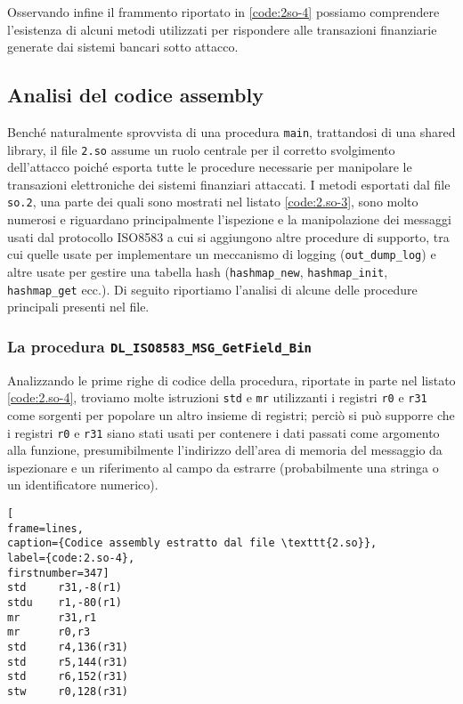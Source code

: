 \documentclass[10pt,a4paper, titlepage]{report}
\begin{document}
Osservando infine il frammento riportato in \ref{code:2so-4} possiamo comprendere l'esistenza di alcuni metodi utilizzati per rispondere alle transazioni finanziarie generate dai sistemi bancari sotto attacco.

\subsection{Analisi del codice assembly}

Benché naturalmente sprovvista di una procedura \texttt{main}, trattandosi di una shared library, il file \texttt{2.so} assume un ruolo centrale per il corretto svolgimento dell'attacco poiché esporta tutte le procedure necessarie per manipolare le transazioni elettroniche dei sistemi finanziari attaccati.
I metodi esportati dal file \texttt{so.2}, una parte dei quali sono mostrati nel listato \ref{code:2.so-3}, sono molto numerosi e riguardano principalmente l'ispezione e la manipolazione dei messaggi usati dal protocollo ISO8583 a cui si aggiungono altre procedure di supporto, tra cui quelle usate per implementare un meccanismo di logging (\texttt{out\_dump\_log}) e altre usate per gestire una tabella hash (\texttt{hashmap\_new}, \texttt{hashmap\_init}, \texttt{hashmap\_get} ecc.).
Di seguito riportiamo l'analisi di alcune delle procedure principali presenti nel file.

\subsubsection{La procedura \texttt{DL\_ISO8583\_MSG\_GetField\_Bin}} 

Analizzando le prime righe di codice della procedura, riportate in parte nel listato \ref{code:2.so-4}, troviamo molte istruzioni \texttt{std} e \texttt{mr} utilizzanti i registri \texttt{r0} e \texttt{r31} come sorgenti per popolare un altro insieme di registri; perciò si può supporre che i registri \texttt{r0} e \texttt{r31} siano stati usati per contenere i dati passati come argomento alla funzione, presumibilmente l'indirizzo dell'area di memoria del messaggio da ispezionare e un riferimento al campo da estrarre (probabilmente una stringa o un identificatore numerico).

\begin{lstlisting}[
frame=lines, 
caption={Codice assembly estratto dal file \texttt{2.so}}, 
label={code:2.so-4},
firstnumber=347]
std     r31,-8(r1)
stdu    r1,-80(r1)
mr      r31,r1
mr      r0,r3
std     r4,136(r31)
std     r5,144(r31)
std     r6,152(r31)
stw     r0,128(r31)
\end{lstlisting}
\end{document}
